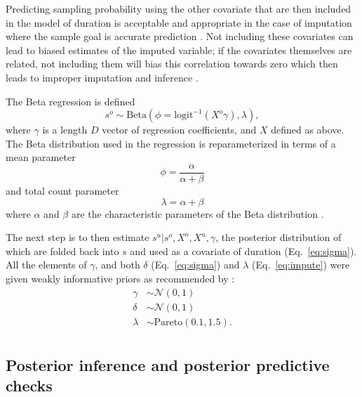 \documentclass[11pt]{article}
\begin{document}
Predicting sampling probability using the other covariate that are then included in the model of duration is acceptable and appropriate in the case of imputation where the sample goal is accurate prediction \citep{Rubin1996,Gelman2007}. Not including these covariates can lead to biased estimates of the imputed variable; if the covariates themselves are related, not including them will bias this correlation towards zero which then leads to improper imputation and inference \citep{Rubin1996}.

The Beta regression is defined
\begin{equation}
  s^{o} \sim \mathrm{Beta}(\phi = \text{logit}^{-1}(X^{o} \gamma), \lambda),
  \label{eq:impute}
\end{equation}
where \(\gamma\) is a length \(D\) vector of regression coefficients, and \(X\) defined as above. The Beta distribution used in the regression is reparameterized in terms of a mean parameter
\begin{equation}
  \phi = \frac{\alpha}{\alpha + \beta}
\end{equation}
and total count parameter
\begin{equation}
  \lambda = \alpha + \beta
\end{equation}
where \(\alpha\) and \(\beta\) are the characteristic parameters of the Beta distribution \citep{Gelman2013d}.

The next step is to then estimate \(s^{u} | s^{o}, X^{o}, X^{u}, \gamma\), the posterior distribution of which are folded back into \(s\) and used as a covariate of duration (Eq.~\ref{eq:sigma}). All the elements of \(\gamma\), and both \(\delta\) (Eq.~\ref{eq:sigma}) and \(\lambda\) (Eq.~\ref{eq:impute}) were given weakly informative priors as recommended by \citet{StanManual}:
\begin{equation}
  \begin{aligned}
    \gamma &\sim \mathcal{N}(0, 1) \\
    \delta &\sim \mathcal{N}(0, 1) \\
    \lambda &\sim \mathrm{Pareto}(0.1, 1.5). \\
  \end{aligned}
\end{equation}


\subsection*{Posterior inference and posterior predictive checks}
\end{document}
